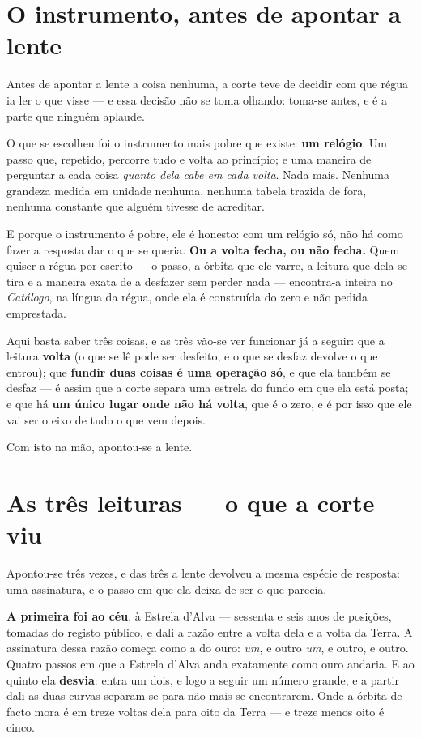 \documentclass[livro.tex]{subfiles}
\begin{document}
\section{O instrumento, antes de apontar a lente}

Antes de apontar a lente a coisa nenhuma, a corte teve de decidir com que régua ia ler o
que visse --- e essa decisão não se toma olhando: toma-se antes, e é a parte que ninguém
aplaude.

O que se escolheu foi o instrumento mais pobre que existe: \textbf{um relógio}. Um passo
que, repetido, percorre tudo e volta ao princípio; e uma maneira de perguntar a cada coisa
\emph{quanto dela cabe em cada volta}. Nada mais. Nenhuma grandeza medida em unidade
nenhuma, nenhuma tabela trazida de fora, nenhuma constante que alguém tivesse de acreditar.

E porque o instrumento é pobre, ele é honesto: com um relógio só, não há como fazer a
resposta dar o que se queria. \textbf{Ou a volta fecha, ou não fecha.} Quem quiser a régua
por escrito --- o passo, a órbita que ele varre, a leitura que dela se tira e a maneira
exata de a desfazer sem perder nada --- encontra-a inteira no \emph{Catálogo}, na
língua da régua, onde ela é construída do zero e não pedida emprestada.

Aqui basta saber três coisas, e as três vão-se ver funcionar já a seguir: que a leitura
\textbf{volta} (o que se lê pode ser desfeito, e o que se desfaz devolve o que entrou);
que \textbf{fundir duas coisas é uma operação só}, e que ela também se desfaz --- é assim
que a corte separa uma estrela do fundo em que ela está posta; e que há \textbf{um único
lugar onde não há volta}, que é o zero, e é por isso que ele vai ser o eixo de tudo o que
vem depois.

Com isto na mão, apontou-se a lente.

\section{As três leituras --- o que a corte viu}

Apontou-se três vezes, e das três a lente devolveu a mesma espécie de resposta: uma
assinatura, e o passo em que ela deixa de ser o que parecia.

\medskip
\noindent \textbf{A primeira foi ao céu}, à Estrela d'Alva --- sessenta e seis anos de
posições, tomadas do registo público, e dali a razão entre a volta dela e a volta da
Terra. A assinatura dessa razão começa como a do ouro: \emph{um}, e outro \emph{um}, e
outro, e outro. Quatro passos em que a Estrela d'Alva anda exatamente como ouro
andaria. E ao quinto ela \textbf{desvia}: entra um dois, e logo a seguir um número
grande, e a partir dali as duas curvas separam-se para não mais se encontrarem. Onde a
órbita de facto mora é em treze voltas dela para oito da Terra --- e treze menos oito é
cinco.
\end{document}
